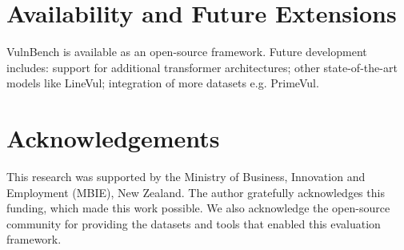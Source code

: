 \documentclass[letterpaper]{article}
\begin{document}
\section{Availability and Future Extensions}

VulnBench is available as an open-source framework. Future development includes: support for additional transformer architectures; other state-of-the-art models like LineVul\citep{linevul2022}; integration of more datasets e.g. PrimeVul\citep{ding2025vulnerability}.

\section*{Acknowledgements}
This research was supported by the Ministry of Business, Innovation and Employment (MBIE), New Zealand. The author gratefully acknowledges this funding, which made this work possible.
We also acknowledge the open-source community for providing the datasets and tools that enabled this evaluation framework.



\end{document}
